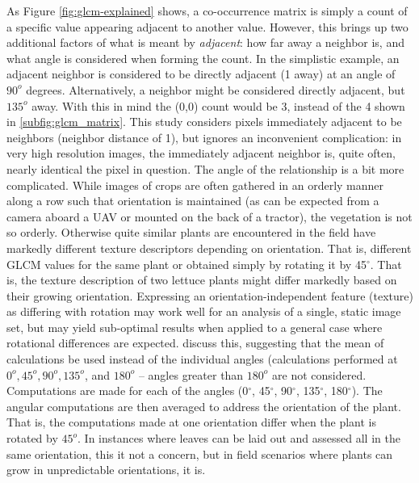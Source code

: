 \documentclass[letterpaper]{article}
\begin{document}
{As Figure \ref{fig:glcm-explained} shows, a co-occurrence matrix is simply a count of a specific value appearing adjacent to another value. However, this brings up two additional factors of what is meant by \textit{adjacent}: how far away a neighbor is, and what angle is considered when forming the count. In the simplistic example, an adjacent neighbor is considered to be directly adjacent (1 away) at an angle of $90^o$ degrees. Alternatively, a neighbor might be considered directly adjacent, but $135^o$ away.  With this in mind the (0,0) count would be 3, instead of the 4 shown in \ref{subfig:glcm_matrix}. This study considers pixels immediately adjacent to be neighbors (neighbor distance of 1), but ignores an inconvenient  complication: in very high resolution images, the immediately adjacent neighbor is, quite often, nearly identical the pixel in question. The angle of the relationship is a bit more complicated. While images of crops are often gathered in an orderly manner along a row such that orientation is maintained (as can be expected from a camera aboard a UAV or mounted on the back of a tractor), the vegetation is not so orderly. Otherwise quite similar plants are encountered in the field have markedly different texture descriptors depending on orientation. That is, different GLCM values for the same plant or obtained simply by rotating it by 45$^{\circ}$. That is, the texture description of two lettuce plants might differ markedly based on their growing orientation. Expressing an orientation-independent feature (texture) as differing with rotation may work well for an analysis of a single, static image set, but may yield sub-optimal results when applied to a general case where rotational differences are expected. \citeauthor*{Haralick1973-gr} discuss this, suggesting that the mean of calculations be used instead of the individual angles (calculations performed at $0^o, 45^o, 90^o, 135^o$, and $180^o$ -- angles greater than $180^o$ are not considered. Computations are made for each of the angles (0$^{\circ}$, 45$^{\circ}$, 90$^{\circ}$, 135$^{\circ}$, 180$^{\circ}$). The angular computations are then averaged to address the orientation of the plant. That is, the computations made at one orientation differ when the plant is rotated by $45^o$. In instances where leaves can be laid out and assessed all in the same orientation, this it not a concern, but in field scenarios where plants can grow in unpredictable orientations, it is.

}
\end{document}
